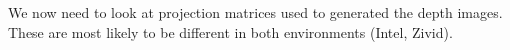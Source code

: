We now need to look at projection matrices used to generated the depth images. These are most likely to be different in both environments (Intel, Zivid).








